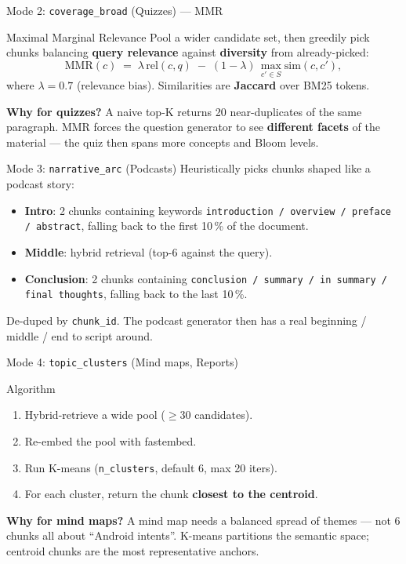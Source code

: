 \documentclass[aspectratio=169, 10pt]{beamer}
\begin{document}
\begin{frame}{Mode 2: \texttt{coverage\_broad} (Quizzes) --- MMR}
  \begin{block}{Maximal Marginal Relevance}
    \scriptsize
    Pool a wider candidate set, then greedily pick chunks balancing
    \textbf{query relevance} against \textbf{diversity} from already-picked:
    \[
      \mathrm{MMR}(c) \;=\; \lambda \, \mathrm{rel}(c, q) \;-\; (1-\lambda)\,
      \max_{c' \in S} \mathrm{sim}(c, c'),
    \]
    where $\lambda = 0.7$ (relevance bias). Similarities are
    \textbf{Jaccard} over BM25 tokens.
  \end{block}

  \scriptsize
  \textbf{Why for quizzes?} A naive top-K returns 20 near-duplicates of
  the same paragraph. MMR forces the question generator to see
  \textbf{different facets} of the material --- the quiz then spans more
  concepts and Bloom levels.
\end{frame}

\begin{frame}{Mode 3: \texttt{narrative\_arc} (Podcasts)}
  \scriptsize
  Heuristically picks chunks shaped like a podcast story:
  \begin{itemize}
    \setlength\itemsep{0pt}
    \item \textbf{Intro}: 2 chunks containing keywords
          \texttt{introduction / overview / preface / abstract}, falling back
          to the first 10\,\% of the document.
    \item \textbf{Middle}: hybrid retrieval (top-6 against the query).
    \item \textbf{Conclusion}: 2 chunks containing
          \texttt{conclusion / summary / in summary / final thoughts}, falling
          back to the last 10\,\%.
  \end{itemize}
  De-duped by \texttt{chunk\_id}. The podcast generator then has a real
  beginning / middle / end to script around.
\end{frame}

\begin{frame}{Mode 4: \texttt{topic\_clusters} (Mind maps, Reports)}
  \begin{block}{Algorithm}
    \scriptsize
    \begin{enumerate}
      \setlength\itemsep{0pt}
      \item Hybrid-retrieve a wide pool ($\geq 30$ candidates).
      \item Re-embed the pool with fastembed.
      \item Run K-means (\texttt{n\_clusters}, default 6, max 20 iters).
      \item For each cluster, return the chunk \textbf{closest to the centroid}.
    \end{enumerate}
  \end{block}

  \scriptsize
  \textbf{Why for mind maps?} A mind map needs a balanced spread of
  themes --- not 6 chunks all about ``Android intents''. K-means
  partitions the semantic space; centroid chunks are the most
  representative anchors.
\end{frame}
\end{document}
